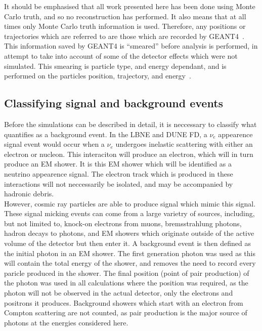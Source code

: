 It should be emphasised that all work presented here has been done using Monte Carlo truth, and so no reconstruction has performed. It also means that at all times only Monte Carlo truth information is used. Therefore, any positions or trajectories which are referred to are those which are recorded by GEANT4~\citep{GEANT4}. This information saved by GEANT4 is ``smeared'' before analysis is performed, in attempt to take into account of some of the detector effects which were not simulated. This smearing is particle type, and energy dependant, and is performed on the particles position, trajectory, and energy~\citep{MartinsThesis, LBNE7806}. \\

\subsection{Classifying signal and background events}
Before the simulations can be described in detail, it is neccessary to classify what quantifies as a background event. In the LBNE and DUNE FD, a $\nu_{e}$ appearence signal event would occur when a $\nu_{e}$ undergoes inelastic scattering with either an electron or nucleon. This interaciton will produce an electron, which will in turn produce an EM shower. It is this EM shower which will be identified as a neutrino appearence signal. The electron track which is produced in these interactions will not neccessarily be isolated, and may be accompanied by hadronic debris. \\

However, cosmic ray particles are able to produce signal which mimic this signal. These signal micking events can come from a large varietry of sources, including, but not limited to, knock-on electrons from muons, bremsstrahlung photons, hadron decays to photons, and EM showers which originate outside of the active volume of the detector but then enter it. A background event is then defined as the initial photon in an EM shower. The first generation photon was used as this will contain the total energy of the shower, and removes the need to record every paricle produced in the shower. The final position (point of pair production) of the photon was used in all calculations where the position was required, as the photon will not be observed in the actual detector, only the electrons and positrons it produces. Background showers which start with an electron from Compton scattering are not counted, as pair production is the major source of photons at the energies considered here. \\

